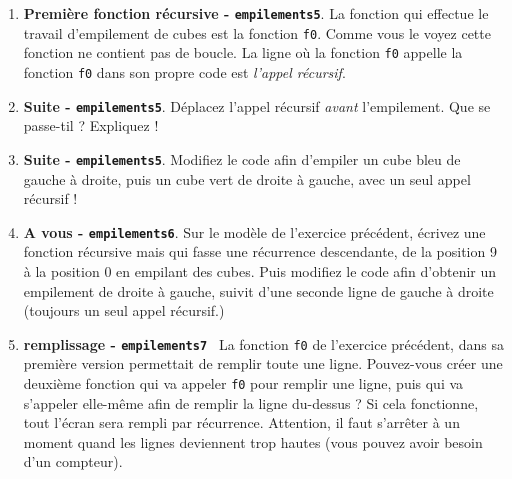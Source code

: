 \documentclass[11pt,a4paper]{article}
\newcommand{\checkbox}{$\square$ \smallskip}
\newcounter{exo} \setcounter{exo}{0}
\newenvironment{action}{%
    \begin{enumerate}[\numerotation] \addtocounter{exo}{-1}%
        }{%
    \end{enumerate}
}
\newcommand{\numexoa}{\theexo \addtocounter{exo}{1}}
\newcommand{\numerotation}{\checkbox \smallskip \numexoa.}
\begin{document}
\begin{action}
\item {\bf Première fonction récursive - \tt empilements5}. La fonction qui effectue le travail d'empilement de cubes est la fonction {\tt f0}. 
Comme vous le voyez cette fonction ne contient pas de boucle.  La ligne où la fonction {\tt f0}
appelle la fonction {\tt f0} dans son propre code est \emph{l'appel récursif}. 
\item {\bf Suite - \tt empilements5}. Déplacez l'appel récursif \emph{avant} l'empilement. Que se passe-til ? Expliquez !
\item {\bf Suite - \tt empilements5}. Modifiez le code afin d'empiler un cube bleu de gauche à droite, puis un cube vert
de droite à gauche, avec un seul appel récursif !
\item {\bf A vous - \tt empilements6}. Sur le modèle de l'exercice précédent, écrivez une fonction récursive mais qui
fasse une récurrence descendante, de la position 9 à la position 0 en empilant des cubes. Puis modifiez le code afin
d'obtenir un empilement de droite à gauche, suivit d'une seconde ligne de gauche à droite (toujours un seul appel récursif.)
\item {\bf remplissage - \tt empilements7 } La fonction {\tt f0} de l'exercice précédent, dans sa première version permettait de remplir
toute une ligne. Pouvez-vous créer une deuxième fonction qui va appeler {\tt f0} pour remplir une ligne, 
puis qui va s'appeler elle-même afin de remplir la ligne du-dessus ? Si cela fonctionne, tout l'écran sera rempli par récurrence.
Attention, il faut s'arrêter à un moment quand les lignes deviennent trop hautes (vous pouvez avoir besoin d'un compteur).
\end{action}
\end{document}
